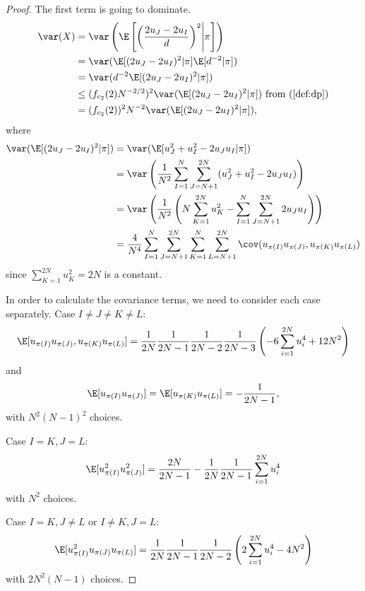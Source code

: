 \begin{proof}
  The first term is going to dominate.
  \begin{align*}
    \var(X) 
    &= \var \left ( \E \left [ \left ( \frac{2u_J-2u_I}{d} \right )^2
       \middle | \pi \right ] \right ) \\
   &= \var (\E [(2u_J-2u_I)^2 | \pi ] \E[d^{-2} | \pi] ) \\
   &= \var (d^{-2} \E [(2u_J-2u_I)^2 | \pi ]) \\
   &\leq (f_{c_2}(2) N^{-2/2})^2 \var(\E [(2u_J-2u_I)^2 | \pi ]) 
   \text{ from } (\ref{def:dp}) \\
   &= (f_{c_2}(2))^2 N^{-2} \var(\E [(2u_J-2u_I)^2 | \pi ]),
  \end{align*}
  where
  \begin{align*}
    \var (\E[(2u_J-2u_I)^2 | \pi]) 
    &= \var(\E[u_J^2+u_I^2-2u_Ju_I|\pi]) \\
    &= \var \left ( \frac{1}{N^2} \sum_{I=1}^{N}\sum_{J=N+1}^{2N}
    (u_J^2+u_I^2-2u_Ju_I) \right ) \\
    &= \var \left ( \frac{1}{N^2} \left ( N \sum_{K=1}^{2N}u_K^2 -
      \sum_{I=1}^{N}\sum_{J=N+1}^{2N}2u_Ju_I \right ) \right ) \\
    &= \frac{4}{N^4}
    \sum_{I=1}^{N}\sum_{J=N+1}^{2N}\sum_{K=1}^{N}\sum_{L=N+1}^{2N}
    \cov(u_{\pi(I)}u_{\pi(J)},u_{\pi(K)}u_{\pi(L)})
  \end{align*}
  since $\sum_{K=1}^{2N}u_K^2 = 2N$ is a constant.

  In order to calculate the covariance terms, we need to consider each
  case separately.
  Case $I \neq J \neq K \neq L$: 
  \begin{equation*}
    \E[u_{\pi(I)}u_{\pi(J)},u_{\pi(K)}u_{\pi(L)}] =
    \frac{1}{2N}\frac{1}{2N-1}\frac{1}{2N-2}\frac{1}{2N-3} \left ( -6
      \sum_{i=1}^{2N}u_i^4 + 12N^2 \right ) 
  \end{equation*}
  and
  \begin{equation*}
    \E[u_{\pi(I)}u_{\pi(J)}] = \E[u_{\pi(K)}u_{\pi(L)}] =
    -\frac{1}{2N-1},
  \end{equation*}
  with $N^2(N-1)^2$ choices.
  
  Case $I=K, J=L$:
  \begin{equation*}
    \E[u_{\pi(I)}^2 u_{\pi(J)}^2] = \frac{2N}{2N-1} -
    \frac{1}{2N}\frac{1}{2N-1}\sum_{i=1}^{2N}u_i^4 
  \end{equation*}
  with $N^2$ choices.

  Case $I=K, J\neq L$ or $I\neq K, J= L$:
  \begin{equation*}
    \E[u_{\pi(I)}^2 u_{\pi(J)}u_{\pi(L)}] =
    \frac{1}{2N}\frac{1}{2N-1}\frac{1}{2N-2}\left (
      2 \sum_{i=1}^{2N} u_i^4 - 4N^2 \right ) 
  \end{equation*}
  with $2N^2(N-1)$ choices.  


\end{proof}
